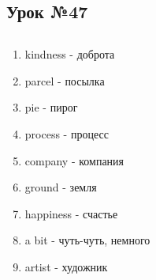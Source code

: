 \subsection{Урок №47}

\subsection*{}
\begin{multicols}{2}
    \begin{enumerate}\setlength{\itemsep}{0pt}
        \item kindness - доброта
        \item parcel - посылка
        \item pie - пирог
        \item process - процесс
        \item company - компания
        \item ground - земля
        \item happiness - счастье
        \item a bit - чуть-чуть, немного
        \item artist - художник
    \end{enumerate}
\end{multicols}